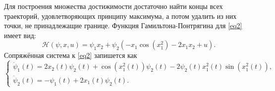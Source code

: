 \documentclass[a4paper,12pt]{article}
\begin{document}
Для построения множества достижимости достаточно найти концы всех траекторий, удовлетворяющих принципу максимума, а потом удалить из них точки, не принадлежащие границе. 
Функция Гамильтона-Понтрягина для \eqref{eq2} имеет вид:
\[ \mathcal{H}(\psi, x, u) = \psi_1x_2 + \psi_2(-x_1\cos\left(x_1^2\right) - 2x_1x_2 + u). \]
Сопряжённая система к \eqref{eq2} запишется как
\begin{equation}\label{eq6}
	\begin{cases}
		\dot{\psi}_1(t) = 2x_2(t)\psi_2(t) + \cos \left( x_1^2(t) \right)\psi_2(t) - 2 \psi_2(t) x_1^2(t) \sin \left( x_1^2(t) \right), \\
		\dot{\psi}_2(t) = -\psi_1(t) + 2x_1(t) \psi_2(t). 
	\end{cases}
\end{equation}
\end{document}
